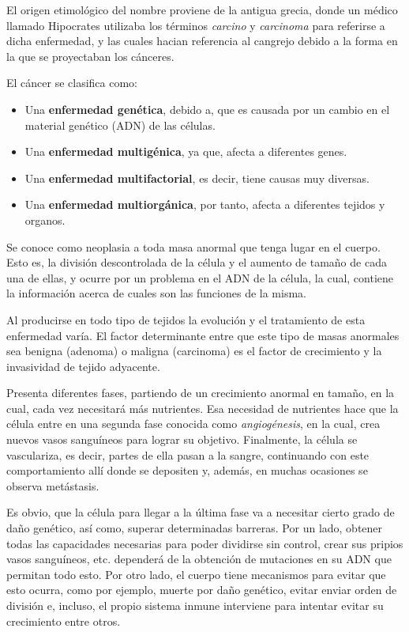 El origen etimológico del nombre proviene de la antigua grecia, donde un médico llamado
Hipocrates utilizaba los términos \textit{carcino} y \textit{carcinoma} para referirse
a dicha enfermedad, y las cuales hacian referencia al cangrejo debido a la forma en la
que se proyectaban los cánceres.

El cáncer se clasifica como:

\begin{itemize}
    \item Una \textbf{enfermedad genética}, debido a, que es causada por un cambio en el
    material genético (ADN) de las células.
    \item Una \textbf{enfermedad multigénica}, ya que, afecta a diferentes genes.
    \item Una \textbf{enfermedad multifactorial}, es decir, tiene causas muy diversas.
    \item Una \textbf{enfermedad multiorgánica}, por tanto, afecta a diferentes tejidos y organos.
\end{itemize}

Se conoce como neoplasia a toda masa anormal que tenga lugar en el cuerpo. Esto es, la división
descontrolada de la célula y el aumento de tamaño de cada una de ellas, y ocurre
por un problema en el ADN de la célula, la cual, contiene la información acerca de cuales son
las funciones de la misma.

Al producirse en todo tipo de tejidos la evolución y el tratamiento de esta enfermedad varía.
El factor determinante entre que este tipo de masas anormales sea benigna (adenoma)
o maligna (carcinoma) es el factor de crecimiento y la invasividad de tejido adyacente.

Presenta diferentes fases, partiendo de un crecimiento anormal en tamaño, en la cual,
cada vez necesitará más nutrientes. Esa necesidad de nutrientes hace que la célula entre en
una segunda fase conocida como \textit{angiogénesis}, en la cual, crea nuevos vasos sanguíneos
para lograr su objetivo. Finalmente, la célula se vasculariza, es decir, partes de ella pasan
a la sangre, continuando con este comportamiento allí donde se depositen y, además, en muchas
ocasiones se observa metástasis.

Es obvio, que la célula para llegar a la última fase va a necesitar cierto grado de daño genético,
así como, superar determinadas barreras. Por un lado, obtener todas las capacidades necesarias para
poder dividirse sin control, crear sus pripios vasos sanguíneos, etc. dependerá de la obtención
de mutaciones en su ADN que permitan todo esto. Por otro lado, el cuerpo tiene mecanismos para evitar
que esto ocurra, como por ejemplo, muerte por daño genético, evitar enviar orden de división e, incluso,
el propio sistema inmune interviene para intentar evitar su crecimiento entre otros.

